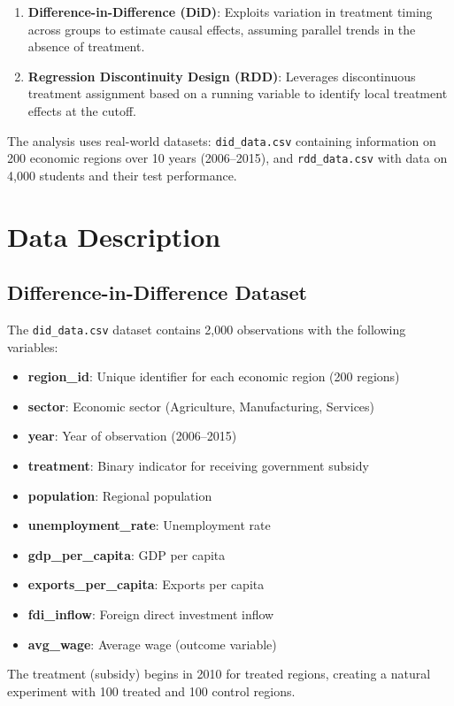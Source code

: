 \documentclass[a4paper,12pt,headsepline]{scrartcl} %
\begin{document}
\begin{enumerate}
    \item \textbf{Difference-in-Difference (DiD)}: Exploits variation in treatment timing across groups to estimate causal effects, assuming parallel trends in the absence of treatment.
    \item \textbf{Regression Discontinuity Design (RDD)}: Leverages discontinuous treatment assignment based on a running variable to identify local treatment effects at the cutoff.
\end{enumerate}

The analysis uses real-world datasets: \texttt{did\_data.csv} containing information on 200 economic regions over 10 years (2006--2015), and \texttt{rdd\_data.csv} with data on 4,000 students and their test performance.

\section{Data Description}

\subsection{Difference-in-Difference Dataset}
The \texttt{did\_data.csv} dataset contains 2,000 observations with the following variables:
\begin{itemize}
    \item \textbf{region\_id}: Unique identifier for each economic region (200 regions)
    \item \textbf{sector}: Economic sector (Agriculture, Manufacturing, Services)
    \item \textbf{year}: Year of observation (2006--2015)
    \item \textbf{treatment}: Binary indicator for receiving government subsidy
    \item \textbf{population}: Regional population
    \item \textbf{unemployment\_rate}: Unemployment rate
    \item \textbf{gdp\_per\_capita}: GDP per capita
    \item \textbf{exports\_per\_capita}: Exports per capita
    \item \textbf{fdi\_inflow}: Foreign direct investment inflow
    \item \textbf{avg\_wage}: Average wage (outcome variable)
\end{itemize}

The treatment (subsidy) begins in 2010 for treated regions, creating a natural experiment with 100 treated and 100 control regions.
\end{document}
